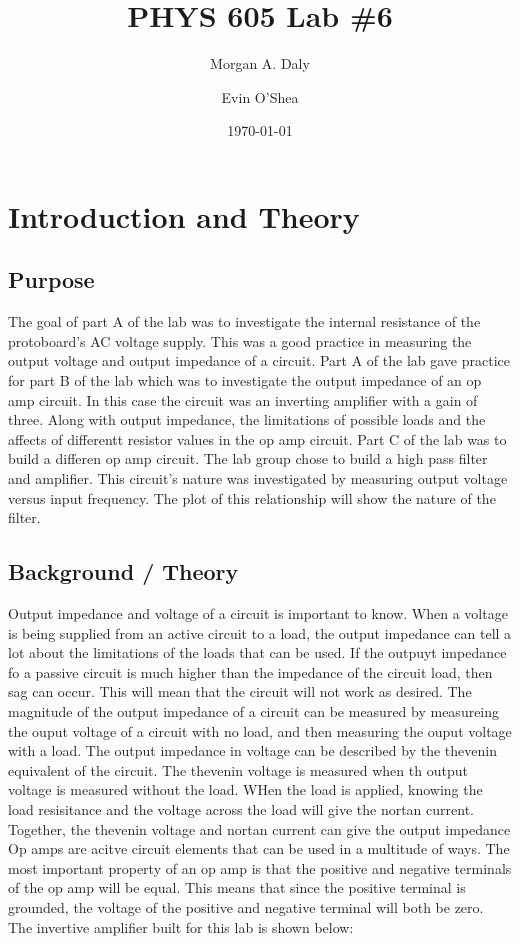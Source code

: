 \documentclass[twocolumn, amsmath]{revtex4}
\begin{document}
\title{PHYS 605 Lab \#6} 

\author{Morgan A. Daly}
\author{Evin O'Shea}
\date{\today} 


\maketitle


\section{Introduction and Theory}
\subsection{Purpose}

The goal of part A of the lab was to investigate the internal resistance of the protoboard's AC voltage supply. This was a good practice in measuring the output voltage and output impedance of a circuit. 
Part A of the lab gave practice for part B of the lab which was to investigate the output impedance of an op amp circuit. In this case the circuit was an inverting amplifier with a gain of three. Along with output impedance, the limitations of possible loads and the affects of differentt resistor values in the op amp circuit.
Part C of the lab was to build a differen op amp circuit. The lab group chose to build a high pass filter and amplifier. This circuit's nature was investigated by measuring output voltage versus input frequency. The plot of this relationship will show the nature of the filter.

\subsection{Background / Theory}

Output impedance and voltage of a circuit is important to know. When a voltage is being supplied from an active circuit to a load, the output impedance can tell a lot about the limitations of the loads that can be used. If the outpuyt impedance fo a passive circuit is much higher than the impedance of the circuit load, then sag can occur. This will mean that the circuit will not work as desired. The magnitude of the output impedance of a circuit can be measured by measureing the ouput voltage of a circuit with no load, and then measuring the ouput voltage with a load. The output impedance in voltage can be described by the thevenin equivalent of the circuit. The thevenin voltage is measured when th output voltage is measured without the load. WHen the load is applied, knowing the load resisitance and the voltage across the load will give the nortan current. Together, the thevenin voltage and nortan current can give the output impedance
Op amps are acitve circuit elements that can be used in a multitude of ways. The most important property of an op amp is that the positive and negative terminals of the op amp will be equal. This means that since the positive terminal is grounded, the voltage of the positive and negative terminal will both be zero.
The invertive amplifier built for this lab is shown below:
\end{document}
